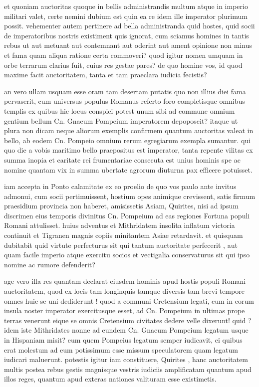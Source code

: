  et quoniam auctoritas quoque in bellis administrandis multum atque in imperio militari valet, certe nemini dubium est quin ea re idem ille imperator plurimum possit. vehementer autem pertinere ad bella administranda quid hostes, quid socii de imperatoribus nostris existiment quis ignorat, cum sciamus homines in tantis rebus ut aut metuant aut contemnant aut oderint aut ament opinione non minus et fama quam aliqua ratione certa commoveri? quod igitur nomen umquam in orbe terrarum clarius fuit, cuius res gestae pares? de quo homine vos, id quod maxime facit auctoritatem, tanta et tam praeclara iudicia fecistis?

 an vero ullam usquam esse oram tam desertam putatis quo non illius diei fama pervaserit, cum universus populus Romanus referto foro completisque omnibus templis ex quibus hic locus conspici potest unum sibi ad commune omnium gentium bellum Cn. Gnaeum Pompeium imperatorem depoposcit? itaque ut plura non dicam neque aliorum exemplis confirmem quantum auctoritas valeat in bello, ab eodem Cn. Pompeio omnium rerum egregiarum exempla sumantur. qui quo die a vobis maritimo bello praepositus est imperator, tanta repente vilitas ex summa inopia et caritate rei frumentariae consecuta est unius hominis spe ac nomine quantam vix in summa ubertate agrorum diuturna pax efficere potuisset.

 iam accepta in Ponto calamitate ex eo proelio de quo vos paulo ante invitus admonui, cum socii pertimuissent, hostium opes animique crevissent, satis firmum praesidium provincia non haberet, amisissetis Asiam, Quirites, nisi ad ipsum discrimen eius temporis divinitus Cn. Pompeium ad eas regiones Fortuna populi Romani attulisset. huius adventus et Mithridatem insolita inflatum victoria continuit et Tigranen magnis copiis minitantem Asiae retardavit. et quisquam dubitabit quid virtute perfecturus sit qui tantum auctoritate perfecerit , aut quam facile imperio atque exercitu socios et vectigalia conservaturus sit qui ipso nomine ac rumore defenderit?

 age vero illa res quantam declarat eiusdem hominis apud hostis populi Romani auctoritatem, quod ex locis tam longinquis tamque diversis tam brevi tempore omnes huic se uni dediderunt ! quod a communi Cretensium legati, cum in eorum insula noster imperator exercitusque esset, ad Cn. Pompeium in ultimas prope terras venerunt eique se omnis Cretensium civitates dedere velle dixerunt! quid ? idem iste Mithridates nonne ad eundem Cn. Gnaeum Pompeium legatum usque in Hispaniam misit? eum quem Pompeius legatum semper iudicavit, ei quibus erat molestum ad eum potissimum esse missum speculatorem quam legatum iudicari maluerunt. potestis igitur iam constituere, Quirites , hanc auctoritatem multis postea rebus gestis magnisque vestris iudiciis amplificatam quantum apud illos reges, quantum apud exteras nationes valituram esse existimetis.

